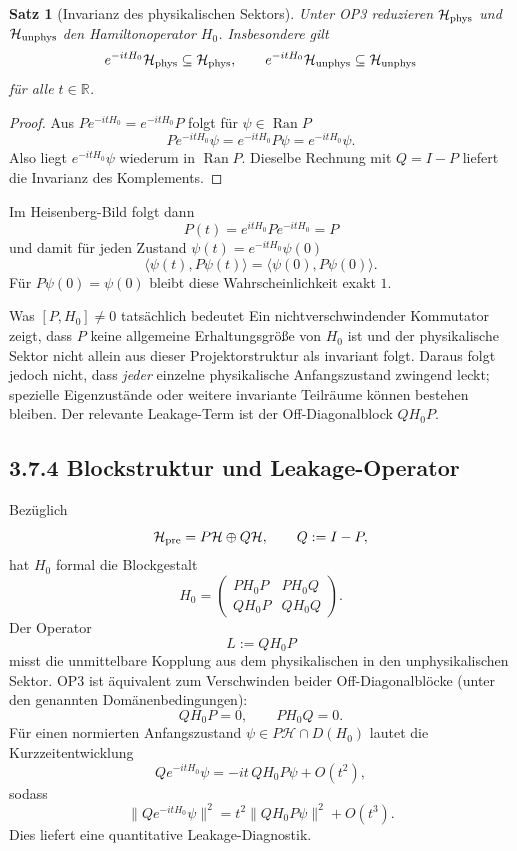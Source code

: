\documentclass[11pt,a4paper]{article}
\newtheorem{satz}{Satz}
\begin{document}
\begin{satz}[Invarianz des physikalischen Sektors]
Unter OP3 reduzieren $\mathcal H_{\rm phys}$ und $\mathcal H_{\rm unphys}$ den Hamiltonoperator $H_0$. Insbesondere gilt
\[
e^{-itH_0}\mathcal H_{\rm phys}\subseteq\mathcal H_{\rm phys},
\qquad
 e^{-itH_0}\mathcal H_{\rm unphys}\subseteq\mathcal H_{\rm unphys}
\]
für alle $t\in\mathbb R$.
\end{satz}

\begin{proof}
Aus $Pe^{-itH_0}=e^{-itH_0}P$ folgt für $\psi\in\operatorname{Ran}P$
\[
P e^{-itH_0}\psi=e^{-itH_0}P\psi=e^{-itH_0}\psi.
\]
Also liegt $e^{-itH_0}\psi$ wiederum in $\operatorname{Ran}P$. Dieselbe Rechnung mit $Q=I-P$ liefert die Invarianz des Komplements.
\end{proof}

Im Heisenberg-Bild folgt dann
\[
P(t)=e^{itH_0}Pe^{-itH_0}=P
\]
und damit für jeden Zustand $\psi(t)=e^{-itH_0}\psi(0)$
\[
\boxed{\langle\psi(t),P\psi(t)\rangle
=\langle\psi(0),P\psi(0)\rangle.}
\]
Für $P\psi(0)=\psi(0)$ bleibt diese Wahrscheinlichkeit exakt $1$.

\begin{statusbox}{Was $[P,H_0]\neq0$ tatsächlich bedeutet}
Ein nichtverschwindender Kommutator zeigt, dass $P$ keine allgemeine Erhaltungsgröße von $H_0$ ist und der physikalische Sektor nicht allein aus dieser Projektorstruktur als invariant folgt. Daraus folgt jedoch nicht, dass \emph{jeder} einzelne physikalische Anfangszustand zwingend leckt; spezielle Eigenzustände oder weitere invariante Teilräume können bestehen bleiben. Der relevante Leakage-Term ist der Off-Diagonalblock $QH_0P$.
\end{statusbox}

\subsection*{3.7.4 Blockstruktur und Leakage-Operator}
Bezüglich
\[
\mathcal H_{\rm pre}=P\mathcal H\oplus Q\mathcal H,
\qquad Q:=I-P,
\]
hat $H_0$ formal die Blockgestalt
\[
H_0=
\begin{pmatrix}
PH_0P & PH_0Q\\
QH_0P & QH_0Q
\end{pmatrix}.
\]
Der Operator
\[
\boxed{L:=QH_0P}
\]
misst die unmittelbare Kopplung aus dem physikalischen in den unphysikalischen Sektor. OP3 ist äquivalent zum Verschwinden beider Off-Diagonalblöcke (unter den genannten Domänenbedingungen):
\[
QH_0P=0,
\qquad
PH_0Q=0.
\]
Für einen normierten Anfangszustand $\psi\in P\mathcal H\cap D(H_0)$ lautet die Kurzzeitentwicklung
\[
Qe^{-itH_0}\psi=-it\,QH_0P\psi+O(t^2),
\]
sodass
\[
\|Qe^{-itH_0}\psi\|^2
=t^2\|QH_0P\psi\|^2+O(t^3).
\]
Dies liefert eine quantitative Leakage-Diagnostik.
\end{document}
